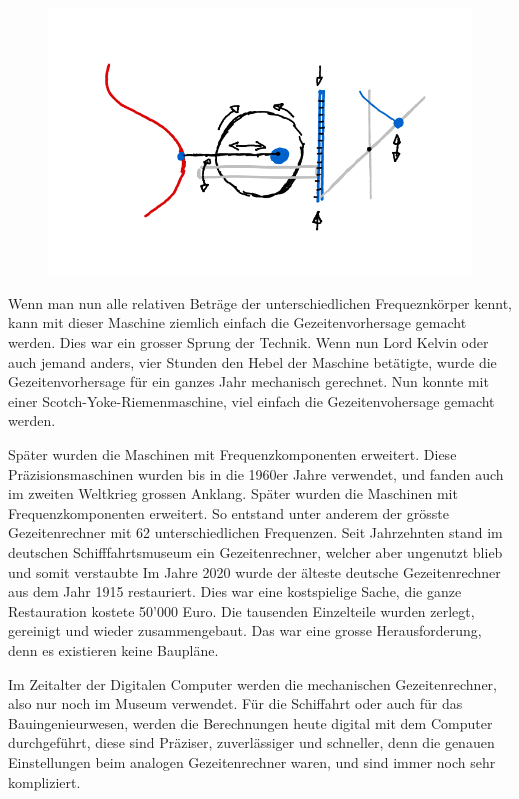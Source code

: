 \begin{figure}
	\centering
	\includegraphics[width=\linewidth]{"papers/gezeiten/Skizze Integralmaschine"}
	\caption{}
	\label{fig:skizze-maschine}
\end{figure}

Wenn man nun alle relativen Beträge der unterschiedlichen Frequeznkörper kennt, kann mit dieser Maschine ziemlich einfach die Gezeitenvorhersage gemacht werden.
Dies war ein grosser Sprung der Technik.
Wenn nun Lord Kelvin oder auch jemand anders, vier Stunden den Hebel der Maschine betätigte, wurde die Gezeitenvorhersage für ein ganzes Jahr mechanisch gerechnet.
Nun konnte mit einer Scotch-Yoke-Riemenmaschine, viel einfach die Gezeitenvohersage gemacht werden.

Später wurden die Maschinen mit Frequenzkomponenten erweitert.
Diese Präzisionsmaschinen wurden bis in die 1960er Jahre verwendet, und fanden auch im zweiten Weltkrieg grossen Anklang.
Später wurden die Maschinen mit Frequenzkomponenten erweitert.
So entstand unter anderem der grösste Gezeitenrechner mit 62 unterschiedlichen Frequenzen.
Seit Jahrzehnten stand im deutschen Schifffahrtsmuseum ein Gezeitenrechner, welcher aber ungenutzt blieb und somit verstaubte
Im Jahre 2020 wurde der älteste deutsche Gezeitenrechner aus dem Jahr 1915 restauriert.
Dies war eine kostspielige Sache, die ganze Restauration kostete 50'000 Euro.
Die tausenden Einzelteile wurden zerlegt, gereinigt und wieder zusammengebaut.
Das war eine grosse Herausforderung, denn es existieren keine Baupläne.

Im Zeitalter der Digitalen Computer werden die mechanischen Gezeitenrechner, also nur noch im Museum verwendet.
Für die Schiffahrt oder auch für das Bauingenieurwesen, werden die Berechnungen heute digital mit dem Computer durchgeführt, diese sind Präziser, zuverlässiger und schneller, denn die genauen Einstellungen beim analogen Gezeitenrechner waren, und sind immer noch sehr kompliziert.




